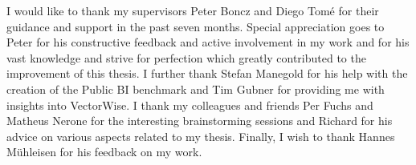 

\begin{acknowledgements}      %

I would like to thank my supervisors Peter Boncz and Diego Tomé for their guidance and support in the past seven months. Special appreciation goes to Peter for his constructive feedback and active involvement in my work and for his vast knowledge and strive for perfection which greatly contributed to the improvement of this thesis. I further thank Stefan Manegold for his help with the creation of the Public BI benchmark and Tim Gubner for providing me with insights into VectorWise. I thank my colleagues and friends Per Fuchs and Matheus Nerone for the interesting brainstorming sessions and Richard for his advice on various aspects related to my thesis. Finally, I wish to thank Hannes Mühleisen for his feedback on my work.

\end{acknowledgements}



